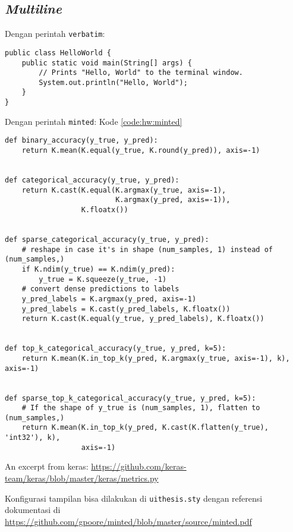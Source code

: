     \subsection{\textit{Multiline}}

    Dengan perintah \verb|verbatim|:

    \begin{verbatim}	
public class HelloWorld {
    public static void main(String[] args) {
        // Prints "Hello, World" to the terminal window.
        System.out.println("Hello, World");
    }
}
\end{verbatim}

    Dengan perintah \verb|minted|: Kode \ref{code:hw:minted}
    \begin{listing}[H]
        \begin{verbatim}
def binary_accuracy(y_true, y_pred):
    return K.mean(K.equal(y_true, K.round(y_pred)), axis=-1)


def categorical_accuracy(y_true, y_pred):
    return K.cast(K.equal(K.argmax(y_true, axis=-1),
                          K.argmax(y_pred, axis=-1)),
                  K.floatx())


def sparse_categorical_accuracy(y_true, y_pred):
    # reshape in case it's in shape (num_samples, 1) instead of (num_samples,)
    if K.ndim(y_true) == K.ndim(y_pred):
        y_true = K.squeeze(y_true, -1)
    # convert dense predictions to labels
    y_pred_labels = K.argmax(y_pred, axis=-1)
    y_pred_labels = K.cast(y_pred_labels, K.floatx())
    return K.cast(K.equal(y_true, y_pred_labels), K.floatx())


def top_k_categorical_accuracy(y_true, y_pred, k=5):
    return K.mean(K.in_top_k(y_pred, K.argmax(y_true, axis=-1), k), axis=-1)


def sparse_top_k_categorical_accuracy(y_true, y_pred, k=5):
    # If the shape of y_true is (num_samples, 1), flatten to (num_samples,)
    return K.mean(K.in_top_k(y_pred, K.cast(K.flatten(y_true), 'int32'), k),
                  axis=-1)
    \end{verbatim}
        \caption{An excerpt from keras: \url{https://github.com/keras-team/keras/blob/master/keras/metrics.py}}
        \label{code:hw:minted}
    \end{listing}

    Konfigurasi tampilan bisa dilakukan di \verb|uithesis.sty| dengan referensi dokumentasi di \url{https://github.com/gpoore/minted/blob/master/source/minted.pdf}

\fi